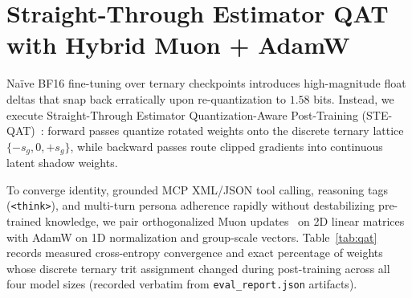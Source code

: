 \documentclass[11pt,a4paper]{article}
\begin{document}
\section{Straight-Through Estimator QAT with Hybrid Muon + AdamW}

Na\"ive BF16 fine-tuning over ternary checkpoints introduces high-magnitude float deltas that snap back erratically upon re-quantization to $1.58$ bits. Instead, we execute Straight-Through Estimator Quantization-Aware Post-Training (STE-QAT)~\cite{bengio2013ste}: forward passes quantize rotated weights onto the discrete ternary lattice $\{-s_g, 0, +s_g\}$, while backward passes route clipped gradients into continuous latent shadow weights.

To converge identity, grounded MCP XML/JSON tool calling, reasoning tags (\texttt{<think>}), and multi-turn persona adherence rapidly without destabilizing pre-trained knowledge, we pair orthogonalized Muon updates~\cite{jordan2024muon} on 2D linear matrices with AdamW on 1D normalization and group-scale vectors. Table~\ref{tab:qat} records measured cross-entropy convergence and exact percentage of weights whose discrete ternary trit assignment changed during post-training across all four model sizes (recorded verbatim from \texttt{eval\_report.json} artifacts).

\begin{table}[ht]
\centering
{}
\caption{Hybrid Muon + AdamW STE-QAT convergence and discrete trit flip rates (\texttt{eval\_report.json}). Over $98.9\%$ of ternary weights remain invariant on the flagship 4B, 9B, and 27B checkpoints.}
\label{tab:qat}
\end{table}
\end{document}
